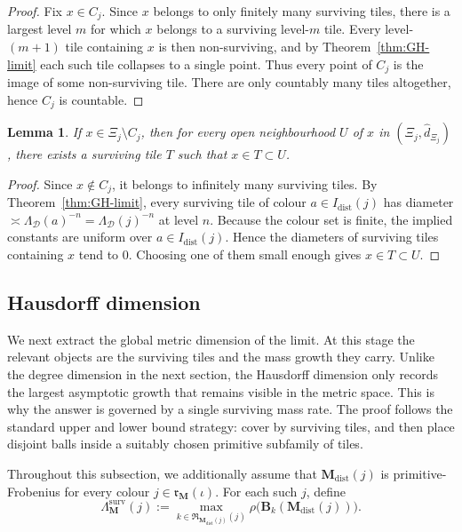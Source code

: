 \documentclass[12pt]{iopart}
\newtheorem{lemma}[theorem]{Lemma}
\newcommand*{\dist}{d}
\begin{document}
\begin{proof}
Fix $x\in C_j$.
Since $x$ belongs to only finitely many surviving tiles, there is a largest level $m$ for which $x$ belongs to a surviving level-$m$ tile.
Every level-$(m+1)$ tile containing $x$ is then non-surviving, and by Theorem~\ref{thm:GH-limit} each such tile collapses to a single point.
Thus every point of $C_j$ is the image of some non-surviving tile.
There are only countably many tiles altogether, hence $C_j$ is countable.
\end{proof}

\begin{lemma}\label{lem:surviving-basis}
If $x\in \Xi_j\setminus C_j$, then for every open neighbourhood $U$ of $x$ in $(\Xi_j,\hat\dist_{\Xi_j})$,
there exists a surviving tile $T$ such that $x\in T\subset U$.
\end{lemma}

\begin{proof}
Since $x\notin C_j$, it belongs to infinitely many surviving tiles.
By Theorem~\ref{thm:GH-limit}, every surviving tile of colour $a\in I_{\mathrm{dist}}(j)$ has diameter
$\asymp \Lambda_{\mathcal D}(a)^{-n}=\Lambda_{\mathcal D}(j)^{-n}$ at level $n$.
Because the colour set is finite, the implied constants are uniform over $a\in I_{\mathrm{dist}}(j)$.
Hence the diameters of surviving tiles containing $x$ tend to $0$.
Choosing one of them small enough gives $x\in T\subset U$.
\end{proof}

\subsection{Hausdorff dimension}

We next extract the global metric dimension of the limit.
At this stage the relevant objects are the surviving tiles and the mass growth they carry.
Unlike the degree dimension in the next section, the Hausdorff dimension only records the largest asymptotic growth that remains visible in the metric space.
This is why the answer is governed by a single surviving mass rate.
The proof follows the standard upper and lower bound strategy: cover by surviving tiles, and then place disjoint balls inside a suitably chosen primitive subfamily of tiles.

Throughout this subsection, we additionally assume that $\mathbf M_{\mathrm{dist}}(j)$ is primitive-Frobenius for every colour
$j\in\mathfrak r_{\mathbf M}(\iota)$.
For each such $j$, define
\[
\Lambda_{\mathbf M}^{\mathrm{surv}}(j)
:=
\max_{k\in \mathfrak R_{\mathbf M_{\mathrm{dist}}(j)}(j)}
\rho\big(\mathbf B_k(\mathbf M_{\mathrm{dist}}(j))\big).
\]
\end{document}

